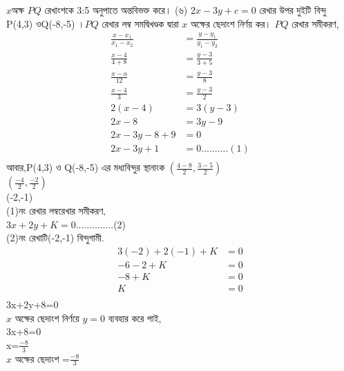 \documentclass{article}
\begin{document}
$x$অক্ষ $PQ$ রেখাংশকে 3:5 অনুপাতে অন্তবিভক্ত করে।
(৬) $2x-3y+c=0$ রেখার উপর দুইটি বিন্দু P(4,3) ওQ(-8,-5) ।$PQ$ রেখার লম্ব সমদ্বিখণ্ডক দ্বারা $x$ অক্ষের ছেদাংশ নির্ণয় কর।
$PQ$ রেখার সমীকরণ,
\begin{align*}
	\frac{x-x_1}{x_1-x_2}&=\frac{y-y_1}{y_1-y_2}\\
	\frac{x-4}{4+8}&=\frac{y-3}{3+5}\\
	\frac{x-a}{12}&=\frac{y-3}{8}\\
	\frac{x-4}{3}&=\frac{y-3}{2}\\
	2(x-4)&=3(y-3)\\
	2x-8&=3y-9\\
	2x-3y-8+9&=0\\
	2x-3y+1&=0..........(1)\\
\end{align*}
আবার,P(4,3) ও Q(-8,-5) এর মধ্যবিন্দুর স্থানাংক $\left(\frac{4-8}{2},\frac{3-5}{2}\right)$\\
$\left(\frac{-4}{2},\frac{-2}{2}\right)$\\
(-2,-1)\\
(1)নং রেখার লম্বরেখার সমীকরণ,\\
$3x+2y+K=0$..............(2)\\ 
(2)নং রেখাটি(-2,-1) বিন্দুগামী.\\
\begin{align*}
3(-2)+2(-1)+K&=0\\
-6-2+K&=0\\
-8+K&=0\\
K&=0\\
\end{align*}
3x+2y+8=0\\ 
$x$ অক্ষের ছেদাংশ নির্ণয়ে $y=0$ ব্যবহার করে পাই,\\
3x+8=0\\
x=$\frac{-8}{3}$\\
$x$ অক্ষের ছেদাংশ =$\frac{-8}{3}$\\
\end{document}
